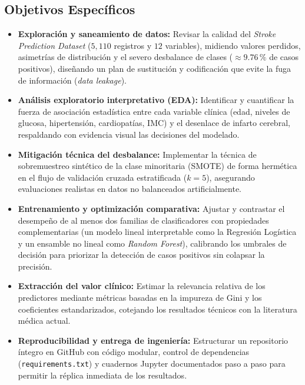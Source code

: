 \documentclass[12pt,a4paper]{article}
\begin{document}
\subsection{Objetivos Específicos}
\begin{itemize}[leftmargin=1.2cm, itemsep=0.3em]
    \item \textbf{Exploración y saneamiento de datos:} Revisar la calidad del \textit{Stroke Prediction Dataset} ($5{,}110$ registros y $12$ variables), midiendo valores perdidos, asimetrías de distribución y el severo desbalance de clases ($\approx 9.76\,\%$ de casos positivos), diseñando un plan de sustitución y codificación que evite la fuga de información (\textit{data leakage}).
    \item \textbf{Análisis exploratorio interpretativo (EDA):} Identificar y cuantificar la fuerza de asociación estadística entre cada variable clínica (edad, niveles de glucosa, hipertensión, cardiopatías, IMC) y el desenlace de infarto cerebral, respaldando con evidencia visual las decisiones del modelado.
    \item \textbf{Mitigación técnica del desbalance:} Implementar la técnica de sobremuestreo sintético de la clase minoritaria (SMOTE) de forma hermética en el flujo de validación cruzada estratificada ($k=5$), asegurando evaluaciones realistas en datos no balanceados artificialmente.
    \item \textbf{Entrenamiento y optimización comparativa:} Ajustar y contrastar el desempeño de al menos dos familias de clasificadores con propiedades complementarias (un modelo lineal interpretable como la Regresión Logística y un ensamble no lineal como \textit{Random Forest}), calibrando los umbrales de decisión para priorizar la detección de casos positivos sin colapsar la precisión.
    \item \textbf{Extracción del valor clínico:} Estimar la relevancia relativa de los predictores mediante métricas basadas en la impureza de Gini y los coeficientes estandarizados, cotejando los resultados técnicos con la literatura médica actual.
    \item \textbf{Reproducibilidad y entrega de ingeniería:} Estructurar un repositorio íntegro en GitHub con código modular, control de dependencias (\texttt{requirements.txt}) y cuadernos Jupyter documentados paso a paso para permitir la réplica inmediata de los resultados.
\end{itemize}

\end{document}
